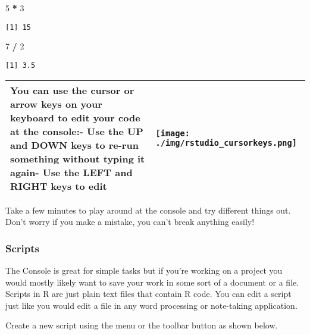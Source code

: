 \documentclass[]{article}
\newenvironment{Shaded}{\begin{snugshade}}{\end{snugshade}}
\newcommand{\DecValTok}[1]{\textcolor[rgb]{0.00,0.00,0.81}{#1}}
\newcommand{\OperatorTok}[1]{\textcolor[rgb]{0.81,0.36,0.00}{\textbf{#1}}}
\newcommand{\StringTok}[1]{\textcolor[rgb]{0.31,0.60,0.02}{#1}}
\begin{document}
\begin{Shaded}
\begin{Highlighting}[]
\DecValTok{5} \OperatorTok{*}\StringTok{ }\DecValTok{3}
\end{Highlighting}
\end{Shaded}

\begin{verbatim}
[1] 15
\end{verbatim}

\begin{Shaded}
\begin{Highlighting}[]
\DecValTok{7} \OperatorTok{/}\StringTok{ }\DecValTok{2}
\end{Highlighting}
\end{Shaded}

\begin{verbatim}
[1] 3.5
\end{verbatim}

\begin{longtable}[]{@{}ll@{}}
\toprule
\endhead
\begin{minipage}[t]{0.69\columnwidth}\raggedright
You can use the cursor or arrow keys on your keyboard to edit your code at the console:- Use the UP and DOWN keys to re-run something without typing it again- Use the LEFT and RIGHT keys to edit\strut
\end{minipage} & \begin{minipage}[t]{0.25\columnwidth}\raggedright
\texttt{[image: ./img/rstudio\_cursorkeys.png]}\strut
\end{minipage}\tabularnewline
\bottomrule
\end{longtable}

Take a few minutes to play around at the console and try different things out. Don't worry if you make a mistake, you can't break anything easily!

\hypertarget{scripts}{%
\subsubsection{Scripts}\label{scripts}}

The Console is great for simple tasks but if you're working on a project you would mostly likely want to save your work in some sort of a document or a file. Scripts in R are just plain text files that contain R code. You can edit a script just like you would edit a file in any word processing or note-taking application.

Create a new script using the menu or the toolbar button as shown below.
\end{document}
